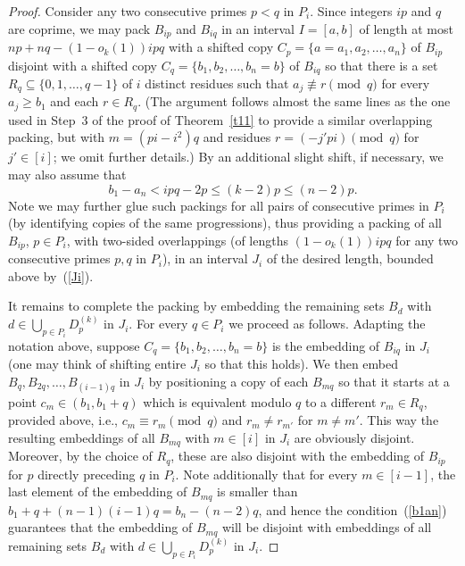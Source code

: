\documentclass[12pt]{amsart}
\theoremstyle{plain}
\numberwithin{equation}{section}
\begin{document}
\begin{proof}
			
			Consider any two consecutive primes $p<q$ in $P_i$. Since integers $ip$ and $q$ are coprime, we may pack $B_{ip}$ and $B_{iq}$ in an interval $I=[a,b]$ of length at most $np+nq-(1-o_k(1))ipq$ with
			a shifted copy $C_p=\{a=a_1,a_2,\ldots,a_n\}$ of $B_{ip}$ disjoint with a shifted copy $C_q=\{b_1,b_2,\ldots,b_n=b\}$ of $B_{iq}$ so that there
			is a set $R_q\subseteq \{0,1,\ldots,q-1\}$ of $i$ distinct residues
			such that $a_j\not\equiv r\pmod q$ for every $a_j\geqslant b_1$ and each $r\in R_q$.
(The argument follows almost the same lines as the one used in Step~3 of the proof of Theorem~\ref{t11} to provide a similar overlapping packing, but with $m=(pi-i^2)q$ and residues $r=(-j'pi)\pmod q$ for $j'\in[i]$; we omit further details.) By an additional slight shift, if necessary, we may also assume that 
\begin{equation}\label{b1an}
b_1-a_n<ipq-2p\leqslant (k-2)p\leqslant (n-2)p.  
\end{equation}
Note we may further glue 
such packings for all pairs of consecutive primes in $P_i$  (by identifying copies of the same progressions), thus providing a packing of all $B_{ip}$, $p\in P_i$, with two-sided overlappings (of lengths $(1-o_k(1))ipq$ for any two consecutive primes $p,q$ in $P_i$), in an interval $J_i$ of the desired length, bounded above  by~(\ref{Ji}).

			
			It remains to complete the packing by embedding the remaining sets $B_d$ with $d\in\bigcup_{p\in P_i} D_p^{(k)}$ in $J_i$.
			For every $q\in P_i$ we proceed as follows. 
			Adapting the notation above, suppose $C_q=\{b_1,b_2,\ldots,b_n=b\}$ is the embedding of $B_{iq}$ in $J_i$ (one may think of shifting entire $J_i$ so that this holds).
			We then embed $B_q,B_{2q},\ldots,B_{(i-1)q}$ in $J_i$ by positioning a
			copy of each $B_{mq}$ so that it starts at 
			a point $c_m\in (b_1,b_1+q)$ 
			which is equivalent modulo $q$ to a different $r_m\in R_q$, provided above, i.e., $c_m\equiv r_m \pmod q$ and $r_m\neq r_{m'}$ for $m\neq m'$.
			This way the resulting embeddings of all $B_{mq}$ with $m\in [i]$ in $J_i$ are obviously disjoint. Moreover, by the choice of $R_q$, these are also disjoint with the embedding of $B_{ip}$ for $p$ directly preceding $q$ in $P_i$. Note additionally that for every $m\in[i-1]$, the last element of the embedding of $B_{mq}$ is smaller than $b_1+q+(n-1)(i-1)q=b_n-(n-2)q$, 
			and hence the condition~(\ref{b1an}) guarantees that the embedding of $B_{mq}$ will be disjoint with embeddings of all remaining sets $B_d$ with $d\in\bigcup_{p\in P_i} D_p^{(k)}$ in $J_i$. 
			

\end{proof}
\end{document}
